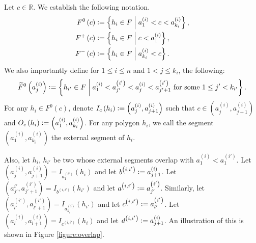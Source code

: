\documentclass[12pt]{article}
\theoremstyle{definition}
\newcommand{\defeq}{\vcentcolon=}
\begin{document}
     Let $c \in \mathbb{R}$.
     We establish the following notation.
     \begin{align*}
         F^{0}\left(c\right) &\defeq
         \left\{h_{i} \in F \;\middle|\;
         a_{1}^{\left(i\right)}
         < c < a_{k_{i}}^{\left(i\right)}\right\}, \\
         F^{+}\left(c\right) &\defeq
         \left\{h_{i} \in F \;\middle|\;
         c < a_{1}^{\left(i\right)}\right\},\\
         F^{-}\left(c\right) &\defeq
         \left\{h_{i} \in F
         \;\middle|\; a_{k_{i}}^{\left(i\right)} < c\right\}.
     \end{align*}
     We also importantly define for
     $1 \leq i \leq n$ and 
     $1 < j \leq k_{i}$, 
     the following:
     \begin{gather*}
         \widetilde{F}^{0}\left(a_{j}^{\left(i\right)}\right)
         \defeq \left\{
         h_{i'} \in F \;\middle|\;
         a_{1}^{\left(i\right)} < a_{j'}^{\left(i'\right)}
         < a_{j}^{\left(i\right)}
         < a_{j'+1}^{\left(i'\right)}
         \text{ for some }
         1 \leq j' < k_{i'} \right\}.
     \end{gather*}
     For any $h_{i} \in F^{0}\left(c\right)$,
     denote $I_{c}\left(h_{i}\right)
     \defeq \left(a_{j}^{\left(i\right)},
     a_{j+1}^{\left(i\right)}\right)$ 
     such that $c \in 
     \left(a_{j}^{\left(i\right)},
     a_{j+1}^{\left(i\right)}\right)$ 
     and $O_{c}\left(h_{i}\right)
     \defeq \left(a_{1}^{\left(i\right)},
     a_{k_{i}}^{\left(i\right)}\right)$.
     For any polygon $h_{i}$,
     we call the segment
     $\left(a_{1}^{\left(i\right)},
     a_{k_{i}}^{\left(i\right)}\right)$
     the external
     segment of $h_{i}$.

     Also, let 
     $h_{i}$, $h_{i'}$ be two
     whose external segments
     overlap with
     $a_1^{\left(i\right)} < a_1^{\left(i'\right)}$.
     Let $\left(a_{j}^{\left(i\right)},
     a_{j+1}^{\left(i\right)}\right) =
     I_{a_1^{\left(i'\right)}}\left(h_{i}\right)$
     and let
     $b^{\left(i, i'\right)} \defeq a_{j+1}^{\left(i\right)}$.
     Let $\left(a_{j'}^{i'}, a_{j'+1}^{\left(i'\right)}\right)
     = I_{b^{\left(i,i'\right)}}\left(h_{i'}\right)$ 
     and let $a^{\left(i,i'\right)}
     \defeq a_{j'}^{\left(i'\right)}$.
     Similarly, let
     $\left(a^{\left(i'\right)}_{l'},
     a^{\left(i'\right)}_{l'+1}\right)
     = I_{a^{\left(i\right)}_{k_{i}}}\left(h_{i'}\right)$ 
     and let $c^{\left(i,i'\right)}
     \defeq a^{\left(i'\right)}_{l'}$.
     Let $\left(a^{\left(i\right)}
     _{l}, a^{\left(i\right)}_{l+1}\right)
     = I_{c^{\left(i, i'\right)}}\left(h_{i}\right)$
     and let 
     $d^{\left(i, i'\right)} \defeq
     a^{\left(i\right)}_{j+1}$.
     An illustration of 
     this is shown in Figure \ref{figure:overlap}.
\end{document}
